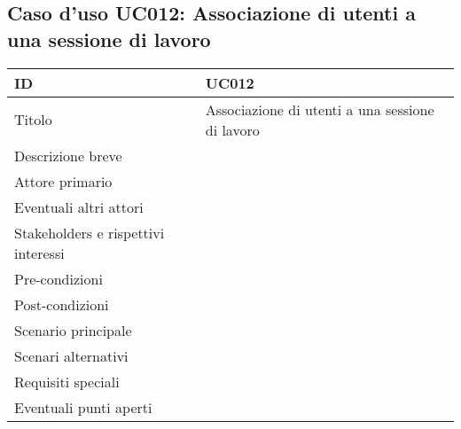 \documentclass[../../main.tex]{subfiles}
\begin{document}
\subsection{Caso d’uso UC012: Associazione di utenti a una sessione di lavoro }
\begin{tabularx}{150mm}{|l|X|}
    \hline
    ID                                  & \textbf{UC012}\\
    \hline
    Titolo                              & Associazione di utenti a una sessione di lavoro \\
    \hline
    Descrizione breve                   &    \\
    \hline
    Attore primario                     &    \\
    \hline
    Eventuali altri attori              &    \\
    \hline
    Stakeholders e rispettivi interessi &    \\
    \hline
    Pre-condizioni                      &    \\
    \hline
    Post-condizioni                     &    \\
    \hline
    Scenario principale                 &    \\
    \hline
    Scenari alternativi                 &    \\
    \hline
    Requisiti speciali                  &    \\
    \hline
    Eventuali punti aperti              &    \\
    \hline
\end{tabularx}
\newpage
\end{document}
